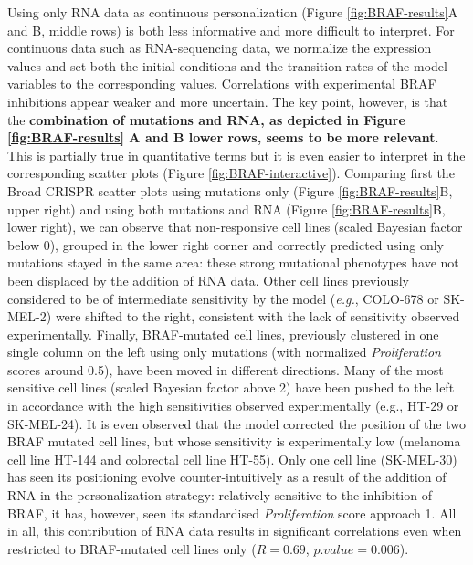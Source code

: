 \documentclass[a4paper,12pt,twoside,onecolumn,openright,final,oldfontcommands]{memoir}
\begin{document}
Using only RNA data as continuous personalization (Figure
\ref{fig:BRAF-results}A and B, middle rows) is both less informative and
more difficult to interpret. For continuous data such as RNA-sequencing
data, we normalize the expression values and set both the initial
conditions and the transition rates of the model variables to the
corresponding values. Correlations with experimental BRAF inhibitions
appear weaker and more uncertain. The key point, however, is that the
\textbf{combination of mutations and RNA, as depicted in Figure
\ref{fig:BRAF-results} A and B lower rows, seems to be more relevant}.
This is partially true in quantitative terms but it is even easier to
interpret in the corresponding scatter plots (Figure
\ref{fig:BRAF-interactive}). Comparing first the Broad CRISPR scatter
plots using mutations only (Figure \ref{fig:BRAF-results}B, upper right)
and using both mutations and RNA (Figure \ref{fig:BRAF-results}B, lower
right), we can observe that non-responsive cell lines (scaled Bayesian
factor below 0), grouped in the lower right corner and correctly
predicted using only mutations stayed in the same area: these strong
mutational phenotypes have not been displaced by the addition of RNA
data. Other cell lines previously considered to be of intermediate
sensitivity by the model (\emph{e.g.}, COLO-678 or SK-MEL-2) were
shifted to the right, consistent with the lack of sensitivity observed
experimentally. Finally, BRAF-mutated cell lines, previously clustered
in one single column on the left using only mutations (with normalized
\emph{Proliferation} scores around 0.5), have been moved in different
directions. Many of the most sensitive cell lines (scaled Bayesian
factor above 2) have been pushed to the left in accordance with the high
sensitivities observed experimentally (e.g., HT-29 or SK-MEL-24). It is
even observed that the model corrected the position of the two BRAF
mutated cell lines, but whose sensitivity is experimentally low
(melanoma cell line HT-144 and colorectal cell line HT-55). Only one
cell line (SK-MEL-30) has seen its positioning evolve
counter-intuitively as a result of the addition of RNA in the
personalization strategy: relatively sensitive to the inhibition of
BRAF, it has, however, seen its standardised \emph{Proliferation} score
approach 1. All in all, this contribution of RNA data results in
significant correlations even when restricted to BRAF-mutated cell lines
only (\(R=0.69\), \(p.value=0.006\)).
\end{document}
